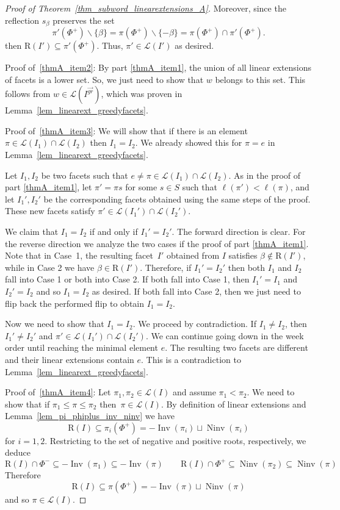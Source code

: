 \documentclass{amsart}
\theoremstyle{definition}
\DeclareMathOperator{\Inv}{Inv} %
\DeclareMathOperator{\Ninv}{Ninv} %
\newcommand{\linearExtensions}{\mathcal{L}} %
\newcommand{\Roots}{\mathrm{R}} %
\newcommand{\antiGreedyFacet}{I^{\overrightarrow{gr}}} %
\begin{document}
\begin{proof}[Proof of Theorem~\ref{thm_subword_linearextensions_A}]
Moreover, since the reflection $s_\beta$ preserves the set 
$$\pi'(\Phi^+)\smallsetminus \{\beta\} =
\pi(\Phi^+)\smallsetminus \{-\beta\} =
\pi(\Phi^+) \cap \pi'(\Phi^+).
$$
then $\Roots(I')\subseteq \pi'(\Phi^+)$. 
Thus, $\pi'\in \linearExtensions(I')$ as desired.

Proof of~\eqref{thmA_item2}: 
By part \eqref{thmA_item1}, the union of all linear extensions of facets is a lower set. So, we just need to show that $w$ belongs to this set. This follows from $w\in \linearExtensions(\antiGreedyFacet)$, which was proven in    Lemma~\ref{lem_linearext_greedyfacets}. 

Proof of~\eqref{thmA_item3}: 
We will show that if there is an element $\pi\in \linearExtensions(I_1)\cap \linearExtensions(I_2)$ then $I_1= I_2$. 
We already showed this for $\pi=e$ in Lemma~\ref{lem_linearext_greedyfacets}.

Let $I_1, I_2$ be two facets such that $e\neq \pi \in \linearExtensions(I_1)\cap \linearExtensions(I_2)$.
As in the proof of part \eqref{thmA_item1}, let $\pi'=\pi s$ for some $s\in S$ such that $\ell(\pi')<\ell(\pi)$, and let $I_1',I_2'$ be the corresponding facets obtained using the same steps of the proof. These new facets satisfy $\pi'\in \linearExtensions(I_1')\cap \linearExtensions(I_2')$. 

We claim that $I_1=I_2$ if and only if $I_1'=I_2'$. 
The forward direction is clear. For the reverse direction we analyze the two cases if the proof of part \eqref{thmA_item1}. Note that in Case~1, the resulting facet~$I'$ obtained from $I$ satisfies $\beta\notin \Roots(I')$, while in Case 2 we have $\beta \in \Roots(I')$.  
Therefore, if $I_1'=I_2'$ then both $I_1$ and $I_2$ fall into Case 1 or both into Case 2. 
If both fall into Case 1, then $I_1'=I_1$ and $I_2'=I_2$ and so $I_1=I_2$ as desired. 
If both fall into Case 2, then we just need to flip back the performed flip to obtain $I_1=I_2$.

Now we need to show that $I_1=I_2$. We proceed by contradiction. If $I_1\neq I_2$, then $I_1'\neq I_2'$ and $\pi'\in \linearExtensions(I_1')\cap \linearExtensions(I_2')$. We can continue going down in the week order until reaching the minimal element $e$. The resulting two facets are different and their linear extensions contain $e$. This is a contradiction to Lemma~\ref{lem_linearext_greedyfacets}.   

Proof of~\eqref{thmA_item4}: 
Let $\pi_1,\pi_2\in \linearExtensions(I)$ and assume $\pi_1<\pi_2$. We need to show that if $\pi_1\leq \pi \leq \pi_2$ then~$\pi \in \linearExtensions(I)$. 
By definition of linear extensions and Lemma~\ref{lem_pi_phiplus_inv_ninv} we have
\[
\Roots(I) \subseteq \pi_i(\Phi^+)=-\Inv(\pi_i)\sqcup \Ninv(\pi_i)
\]
for $i=1,2$. 
Restricting to the set of negative and positive roots, respectively, we deduce
\[
\Roots(I)\cap \Phi^- \subseteq -\Inv(\pi_1) \subseteq -\Inv(\pi) \qquad 
\Roots(I)\cap \Phi^+ \subseteq \Ninv(\pi_2)  \subseteq \Ninv(\pi)
\]
Therefore
\[
\Roots(I) \subseteq \pi(\Phi^+)=-\Inv(\pi)\sqcup \Ninv(\pi)
\]
and so $\pi\in \linearExtensions(I)$.
\end{proof}
\end{document}

